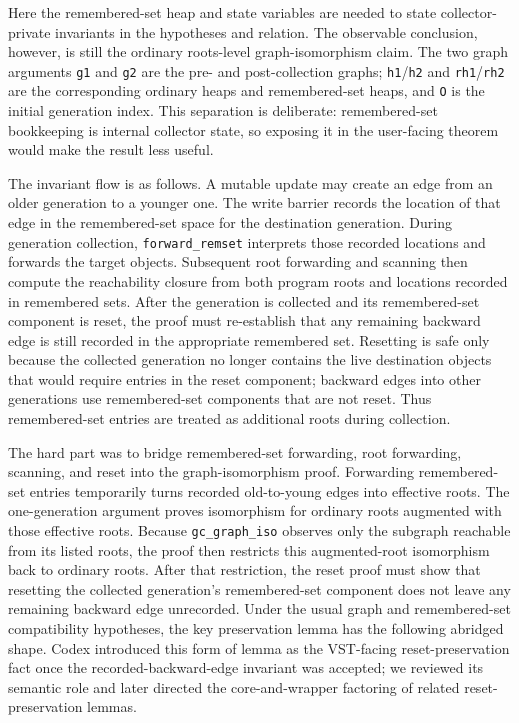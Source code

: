 \documentclass[acmsmall,nonacm]{acmart}
\newcommand{\VST}{VST}
\begin{document}
Here the remembered-set heap and state variables are needed to state
collector-private invariants in the hypotheses and relation.  The observable
conclusion, however, is still the ordinary roots-level graph-isomorphism claim.
The two graph arguments \texttt{g1} and \texttt{g2} are the pre- and
post-collection graphs; \texttt{h1}/\texttt{h2} and
\texttt{rh1}/\texttt{rh2} are the corresponding ordinary heaps and
remembered-set heaps, and \texttt{O} is the initial generation index.  This
separation is deliberate: remembered-set bookkeeping is internal collector
state, so exposing it in the user-facing theorem would make the result less
useful.

The invariant flow is as follows.  A mutable update may create an edge from an
older generation to a younger one.  The write barrier records the location of
that edge in the remembered-set space for the destination generation.  During
generation collection, \texttt{forward\_remset} interprets those recorded
locations and forwards the target objects.  Subsequent root forwarding and
scanning then compute the reachability closure from both program roots and
locations recorded in remembered sets.  After the generation is collected and
its remembered-set component is reset, the proof must re-establish that any
remaining backward edge is still recorded in the appropriate remembered set.
Resetting is safe only because the collected generation no longer contains the
live destination objects that would require entries in the reset component;
backward edges into other generations use remembered-set components that are not
reset.
Thus remembered-set entries are treated as additional roots during collection.

The hard part was to bridge remembered-set forwarding, root forwarding,
scanning, and reset into the graph-isomorphism proof.  Forwarding remembered-set
entries temporarily turns recorded old-to-young edges into effective roots.
The one-generation argument proves isomorphism for ordinary roots augmented with
those effective roots.  Because \texttt{gc\_graph\_iso} observes only the
subgraph reachable from its listed roots, the proof then restricts this
augmented-root isomorphism back to ordinary roots.  After that restriction, the
reset proof must show that resetting the collected generation's remembered-set
component does not leave any remaining backward edge unrecorded.  Under the usual graph
and remembered-set compatibility hypotheses, the key preservation lemma has the
following abridged shape.  Codex introduced this form of lemma as the
\VST{}-facing reset-preservation fact once the recorded-backward-edge invariant
was accepted; we reviewed its semantic role and later directed the
core-and-wrapper factoring of related reset-preservation lemmas.
\end{document}
